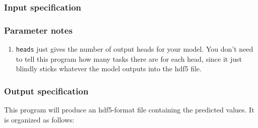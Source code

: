 \documentclass{article}
\begin{document}
\subsubsection{Input specification}



\subsubsection{Parameter notes}

\begin{enumerate}
    \item \texttt{heads} just gives the number of output heads for your model. You don't need to
        tell this program how many tasks there are for each head, since it just blindly sticks
        whatever the model outputs into the hdf5 file.
\end{enumerate}

\subsubsection{Output specification}

This program will produce an hdf5-format file containing the predicted values.
It is organized as follows:
\end{document}
